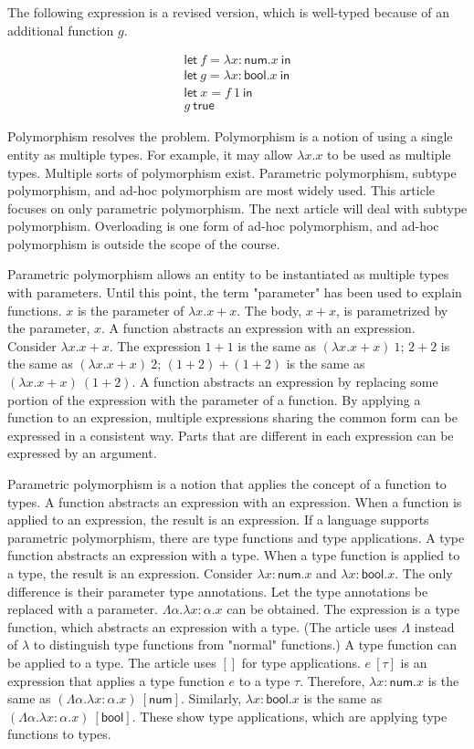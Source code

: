 The following expression is a revised version, which is well-typed because of
an additional function $g$.

\[
\begin{array}{l}
\textsf{let}\ f=\lambda x:\textsf{num}.x\ \textsf{in} \\
\textsf{let}\ g=\lambda x:\textsf{bool}.x\ \textsf{in} \\
\textsf{let}\ x=f\ 1\ \textsf{in} \\
g\ \textsf{true}
\end{array}
\]

Polymorphism resolves the problem. Polymorphism is a notion of using a single
entity as multiple types. For example, it may allow $\lambda x.x$ to be used
as multiple types. Multiple sorts of polymorphism exist. Parametric
polymorphism, subtype polymorphism, and ad-hoc polymorphism are most widely
used. This article focuses on only parametric polymorphism. The next article
will deal with subtype polymorphism. Overloading is one form of ad-hoc
polymorphism, and ad-hoc polymorphism is outside the scope of the course.

Parametric polymorphism allows an entity to be instantiated as multiple types
with parameters. Until this point, the term "parameter" has been used to
explain functions. $x$ is the parameter of $\lambda x.x+x$. The body,
$x+x$, is parametrized by the parameter, $x$. A function abstracts an
expression with an expression. Consider $\lambda x.x+x$. The expression
$1+1$ is the same as $(\lambda x.x+x)\ 1$; $2+2$ is the same as
$(\lambda x.x+x)\ 2$; $(1+2)+(1+2)$ is the same as \((\lambda x.x+x)\
(1+2)\). A function abstracts an expression by replacing some portion of the
expression with the parameter of a function. By applying a function to an
expression, multiple expressions sharing the common form can be expressed in a
consistent way. Parts that are different in each expression can be expressed
by an argument.

Parametric polymorphism is a notion that applies the concept of a function to
types. A function abstracts an expression with an expression. When a function
is applied to an expression, the result is an expression. If a language
supports parametric polymorphism, there are type functions and type
applications. A type function abstracts an expression with a type. When a type
function is applied to a type, the result is an expression. Consider \(\lambda
x:\textsf{num}.x\) and $\lambda x:\textsf{bool}.x$. The only difference is their
parameter type annotations. Let the type annotations be replaced with a
parameter. $\Lambda\alpha.\lambda x:\alpha.x$ can be obtained. The
expression is a type function, which abstracts an expression with a type. (The
article uses $\Lambda$ instead of $\lambda$ to distinguish type functions
from "normal" functions.) A type function can be applied to a type. The
article uses $[]$ for type applications. $e\ [\tau]$ is an expression that
applies a type function $e$ to a type $\tau$. Therefore, \(\lambda x:\textsf{
num}.x\) is the same as $(\Lambda\alpha.\lambda x:\alpha.x)\ [\textsf{num}]$.
Similarly, $\lambda x:\textsf{bool}.x$ is the same as \((\Lambda\alpha.\lambda
x:\alpha.x)\ [\textsf{bool}]\). These show type applications, which are applying
type functions to types.

